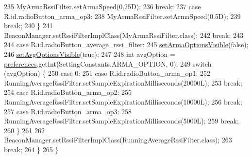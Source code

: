 \begin{DoxyCode}
235                         MyArmaRssiFilter.setArmaSpeed(0.25D);
236                         \textcolor{keywordflow}{break};
237                     \textcolor{keywordflow}{case} R.id.radioButton\_arma\_op3:
238                         MyArmaRssiFilter.setArmaSpeed(0.5D);
239                         \textcolor{keywordflow}{break};
240                 \}
241                 BeaconManager.setRssiFilterImplClass(MyArmaRssiFilter.class);
242                 \textcolor{keywordflow}{break};
243 
244             \textcolor{keywordflow}{case} R.id.radioButton\_average\_rssi\_filter:
245                 \hyperlink{classit_1_1unibo_1_1torsello_1_1bluetoothpositioning_1_1activities_1_1ApplicationActivity_a53f68b9ea3a7805d43d4d2c84a920871_a53f68b9ea3a7805d43d4d2c84a920871}{setArmaOptionsVisible}(\textcolor{keyword}{false});
246                 \hyperlink{classit_1_1unibo_1_1torsello_1_1bluetoothpositioning_1_1activities_1_1ApplicationActivity_ab50a70cb5d2d98211598b297a10bc44f_ab50a70cb5d2d98211598b297a10bc44f}{setAvgOptionsVisible}(\textcolor{keyword}{true});
247 
248                 \textcolor{keywordtype}{int} avgOption = \hyperlink{classit_1_1unibo_1_1torsello_1_1bluetoothpositioning_1_1activities_1_1ApplicationActivity_a3ee672ef79c268d0618ff3276c2e85f0_a3ee672ef79c268d0618ff3276c2e85f0}{preferences}.getInt(SettingConstants.ARMA\_OPTION, 0);
249                 \textcolor{keywordflow}{switch} (avgOption) \{
250                     \textcolor{keywordflow}{case} 0:
251                     \textcolor{keywordflow}{case} R.id.radioButton\_arma\_op1:
252                         RunningAverageRssiFilter.setSampleExpirationMilliseconds(20000L);
253                         \textcolor{keywordflow}{break};
254                     \textcolor{keywordflow}{case} R.id.radioButton\_arma\_op2:
255                         RunningAverageRssiFilter.setSampleExpirationMilliseconds(10000L);
256                         \textcolor{keywordflow}{break};
257                     \textcolor{keywordflow}{case} R.id.radioButton\_arma\_op3:
258                         RunningAverageRssiFilter.setSampleExpirationMilliseconds(5000L);
259                         \textcolor{keywordflow}{break};
260                 \}
261 
262                 BeaconManager.setRssiFilterImplClass(RunningAverageRssiFilter.class);
263                 \textcolor{keywordflow}{break};
264         \}
265     \}
\end{DoxyCode}
\hypertarget{classit_1_1unibo_1_1torsello_1_1bluetoothpositioning_1_1activities_1_1ApplicationActivity_a53d1d26ad17526c6c518c4d8b4db3a8e_a53d1d26ad17526c6c518c4d8b4db3a8e}{}\label{classit_1_1unibo_1_1torsello_1_1bluetoothpositioning_1_1activities_1_1ApplicationActivity_a53d1d26ad17526c6c518c4d8b4db3a8e_a53d1d26ad17526c6c518c4d8b4db3a8e} 

